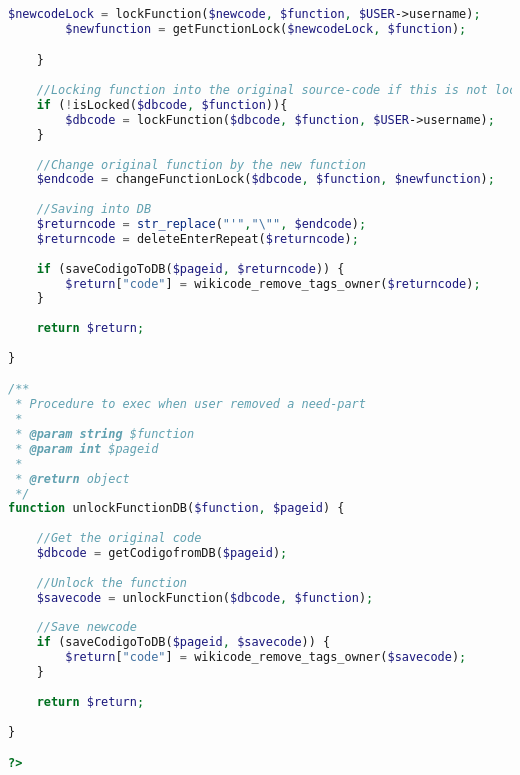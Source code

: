 \begin{lstlisting}[language=PHP]
		$newcodeLock = lockFunction($newcode, $function, $USER->username);
		$newfunction = getFunctionLock($newcodeLock, $function);

	}
	
	//Locking function into the original source-code if this is not locked
	if (!isLocked($dbcode, $function)){
		$dbcode = lockFunction($dbcode, $function, $USER->username);
	}
	
	//Change original function by the new function
	$endcode = changeFunctionLock($dbcode, $function, $newfunction);
	
	//Saving into DB
	$returncode = str_replace("'","\"", $endcode);
	$returncode = deleteEnterRepeat($returncode);
	
	if (saveCodigoToDB($pageid, $returncode)) {
		$return["code"] = wikicode_remove_tags_owner($returncode);
	}
	
	return $return;
	
}

/**
 * Procedure to exec when user removed a need-part
 * 
 * @param string $function
 * @param int $pageid
 * 
 * @return object
 */
function unlockFunctionDB($function, $pageid) {
		
	//Get the original code
	$dbcode = getCodigofromDB($pageid);
	
	//Unlock the function
	$savecode = unlockFunction($dbcode, $function);
	
	//Save newcode
	if (saveCodigoToDB($pageid, $savecode)) {
		$return["code"] = wikicode_remove_tags_owner($savecode);
	}
	
	return $return;
	
}

?>
\end{lstlisting}

